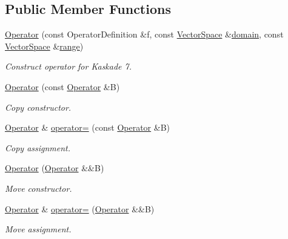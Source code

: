 \subsection*{\-Public \-Member \-Functions}
\begin{DoxyCompactItemize}
\item 
\hyperlink{classSpacy_1_1Kaskade_1_1Operator_ac3b217152eeed8b9f786732d300a024e}{\-Operator} (const \-Operator\-Definition \&f, const \hyperlink{classSpacy_1_1VectorSpace}{\-Vector\-Space} \&\hyperlink{classSpacy_1_1OperatorBase_a2588f9b3e0188820c4c494e63293dc6f}{domain}, const \hyperlink{classSpacy_1_1VectorSpace}{\-Vector\-Space} \&\hyperlink{classSpacy_1_1OperatorBase_ab19d3b7a6f290b1079248f1e567e53d6}{range})
\begin{DoxyCompactList}\small\item\em \-Construct operator for \-Kaskade 7. \end{DoxyCompactList}\item 
\hyperlink{classSpacy_1_1Kaskade_1_1Operator_a01164fcd2ea59f951312c37b39ee4f11}{\-Operator} (const \hyperlink{classSpacy_1_1Kaskade_1_1Operator}{\-Operator} \&\-B)
\begin{DoxyCompactList}\small\item\em \-Copy constructor. \end{DoxyCompactList}\item 
\hyperlink{classSpacy_1_1Kaskade_1_1Operator}{\-Operator} \& \hyperlink{classSpacy_1_1Kaskade_1_1Operator_a18453c4bbf4040cc0534535ae0b0bbd9}{operator=} (const \hyperlink{classSpacy_1_1Kaskade_1_1Operator}{\-Operator} \&\-B)
\begin{DoxyCompactList}\small\item\em \-Copy assignment. \end{DoxyCompactList}\item 
\hyperlink{classSpacy_1_1Kaskade_1_1Operator_a2a579f571c8c488b9e59711689820290}{\-Operator} (\hyperlink{classSpacy_1_1Kaskade_1_1Operator}{\-Operator} \&\&\-B)
\begin{DoxyCompactList}\small\item\em \-Move constructor. \end{DoxyCompactList}\item 
\hyperlink{classSpacy_1_1Kaskade_1_1Operator}{\-Operator} \& \hyperlink{classSpacy_1_1Kaskade_1_1Operator_ad77c4cb938924b8947037bd2adaaa0cf}{operator=} (\hyperlink{classSpacy_1_1Kaskade_1_1Operator}{\-Operator} \&\&\-B)
\begin{DoxyCompactList}\small\item\em \-Move assignment. \end{DoxyCompactList}\item 

\end{DoxyCompactItemize}

